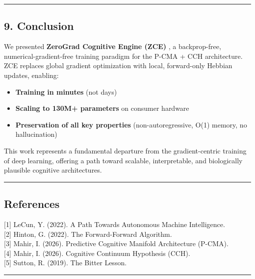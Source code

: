 \documentclass[
  11pt,
  a4paper,
]{article}
\providecommand{\tightlist}{%
  \setlength{\itemsep}{0pt}\setlength{\parskip}{0pt}}
\begin{document}
\begin{center}\rule{0.5\linewidth}{0.5pt}\end{center}

\subsection{9. Conclusion}\label{conclusion}

We presented \textbf{ZeroGrad Cognitive Engine (ZCE)} , a backprop-free,
numerical-gradient-free training paradigm for the P-CMA + CCH
architecture. ZCE replaces global gradient optimization with local,
forward-only Hebbian updates, enabling:

\begin{itemize}
\tightlist
\item
  \textbf{Training in minutes} (not days)
\item
  \textbf{Scaling to 130M+ parameters} on consumer hardware
\item
  \textbf{Preservation of all key properties} (non-autoregressive, O(1)
  memory, no hallucination)
\end{itemize}

This work represents a fundamental departure from the gradient-centric
training of deep learning, offering a path toward scalable,
interpretable, and biologically plausible cognitive architectures.

\begin{center}\rule{0.5\linewidth}{0.5pt}\end{center}

\subsection{References}\label{references}

{[}1{]} LeCun, Y. (2022). A Path Towards Autonomous Machine
Intelligence.\\
{[}2{]} Hinton, G. (2022). The Forward-Forward Algorithm.\\
{[}3{]} Mahir, I. (2026). Predictive Cognitive Manifold Architecture
(P-CMA).\\
{[}4{]} Mahir, I. (2026). Cognitive Continuum Hypothesis (CCH).\\
{[}5{]} Sutton, R. (2019). The Bitter Lesson.

\begin{center}\rule{0.5\linewidth}{0.5pt}\end{center}
\end{document}
